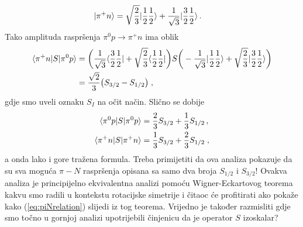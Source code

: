 \begin{primjer}
\begin{align}
| \pi^+ n \rangle &= \sqrt{\frac{2}{3}} | \frac{1}{2} \frac{1}{2} \rangle + 
\frac{1}{\sqrt{3}} | \frac{3}{2} \frac{1}{2} \rangle \,.
\end{align}
Tako amplituda raspršenja $\pi^0 p \to \pi^+ n$ ima oblik
\begin{align}
\langle \pi^+ n |S| \pi^0 p  \rangle &=
\bigg( \frac{1}{\sqrt{3}} \langle \frac{3}{2} \frac{1}{2} | + \sqrt{\frac{2}{3}}
\langle \frac{1}{2} \frac{1}{2} | \bigg) S
\bigg(-\frac{1}{\sqrt{3}} | \frac{1}{2} \frac{1}{2} \rangle +\sqrt{\frac{2}{3}} | \frac{3}{2}\frac{1}{2} \rangle \bigg) \\
&= \frac{\sqrt{2}}{3} \big( S_{3/2} - S_{1/2} \big) \;,
\end{align}
gdje smo uveli oznaku $S_I$ na očit način. Slično se dobije
\begin{align}
\langle \pi^0 p |S| \pi^0 p  \rangle &= \frac{2}{3}S_{3/2} + \frac{1}{3} S_{1/2} \,, \\
\langle \pi^+ n |S| \pi^+ n  \rangle &= \frac{1}{3}S_{3/2} + \frac{2}{3} S_{1/2}  \;,
\end{align}
a onda lako i gore tražena formula.
Treba primijetiti da ova analiza pokazuje da su sva moguća $\pi - N$ raspršenja
opisana sa samo dva broja $S_{1/2}$ i $S_{3/2}$!
Ovakva analiza je principijelno ekvivalentna analizi pomoću Wigner-Eckartovog
teorema kakvu smo radili u kontekstu rotacijske simetrije i
čitaoc će profitirati ako pokaže kako (\ref{eq:piNrelation}) slijedi
iz tog teorema.  Vrijedno je također razmisliti gdje smo točno u gornjoj analizi
upotrijebili činjenicu da je operator $S$ izoskalar?
\end{primjer}

